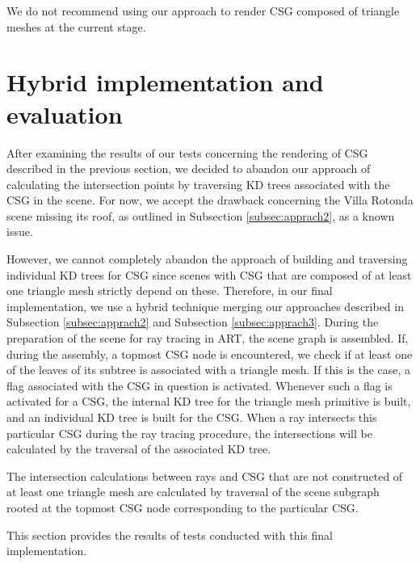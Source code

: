 We do not recommend using our approach to render CSG composed of triangle meshes at the current stage. 


\section{Hybrid implementation and evaluation}
\label{sec:result_normal}

After examining the results of our tests concerning the rendering of CSG described in the previous section, we decided to abandon our approach of calculating the intersection points by traversing KD trees associated with the CSG in the scene. For now, we accept the drawback concerning the Villa Rotonda scene missing its roof, as outlined in Subsection \ref{subsec:apprach2}, as a known issue.

However, we cannot completely abandon the approach of building and traversing individual KD trees for CSG since scenes with CSG that are composed of at least one triangle mesh strictly depend on these. Therefore, in our final implementation, we use a hybrid technique merging our approaches described in Subsection \ref{subsec:apprach2} and Subsection \ref{subsec:apprach3}. During the preparation of the scene for ray tracing in ART, the scene graph is assembled. If, during the assembly, a topmost CSG node is encountered, we check if at least one of the leaves of its subtree is associated with a triangle mesh. If this is the case, a flag associated with the CSG in question is activated. Whenever such a flag is activated for a CSG, the internal KD tree for the triangle mesh primitive is built, and an individual KD tree is built for the CSG.
When a ray intersects this particular CSG during the ray tracing procedure, the intersections will be calculated by the traversal of the associated KD tree.

The intersection calculations between rays and CSG that are not constructed of at least one triangle mesh are calculated by traversal of the scene subgraph rooted at the topmost CSG node corresponding to the particular CSG.

This section provides the results of tests conducted with this final implementation.
\\


